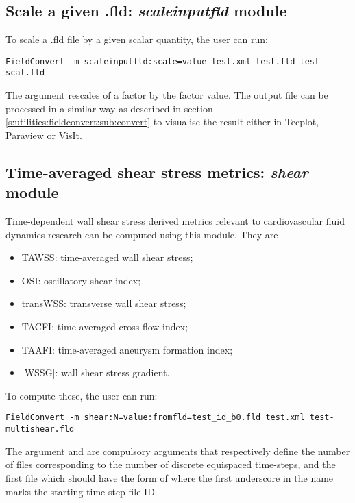%
%
%

\subsection{Scale a given .fld: \textit{scaleinputfld} module}
To scale a .fld file by a given scalar quantity, the user can run:
\begin{lstlisting}[style=BashInputStyle]
FieldConvert -m scaleinputfld:scale=value test.xml test.fld test-scal.fld
\end{lstlisting}
The argument  rescales of a factor 
 by the factor value.
The output file  can be processed in a similar
way as described in section \ref{s:utilities:fieldconvert:sub:convert}
to visualise the result  either in Tecplot, Paraview or VisIt.

%
%
%
\subsection{Time-averaged shear stress metrics: \textit{shear} module}
Time-dependent wall shear stress derived metrics relevant to cardiovascular fluid dynamics research can be computed using this module. They are

\begin{itemize}
\item TAWSS: time-averaged wall shear stress;
\item OSI: oscillatory shear index;
\item transWSS: transverse wall shear stress;
\item TACFI: time-averaged cross-flow index;
\item TAAFI: time-averaged aneurysm formation index;
\item |WSSG|: wall shear stress gradient.
\end{itemize}

To compute these, the user can run:
\begin{lstlisting}[style=BashInputStyle]
FieldConvert -m shear:N=value:fromfld=test_id_b0.fld test.xml test-multishear.fld
\end{lstlisting}
The argument  and  are compulsory arguments that respectively define the number of  files corresponding to the number of discrete equispaced time-steps, and the first  file which should have the form of  where the first underscore in the name marks the starting time-step file ID.

